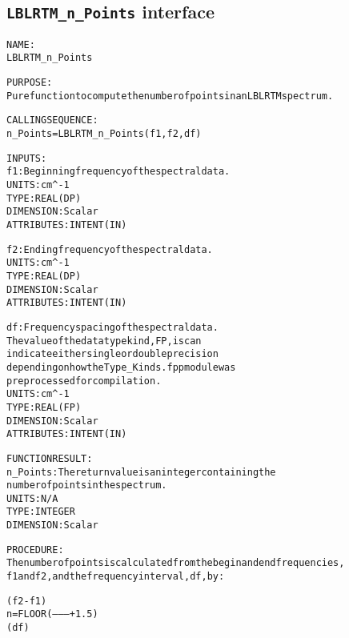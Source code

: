\subsection{\texttt{LBLRTM\_n\_Points} interface}
  \label{sec:LBLRTM_n_Points_interface}
  \begin{alltt}
 
  NAME:
        LBLRTM_n_Points
 
  PURPOSE:
        Pure function to compute the number of points in an LBLRTM spectrum.
 
  CALLING SEQUENCE:
        n_Points = LBLRTM_n_Points( f1, f2, df )
 
  INPUTS:
        f1:        Beginning frequency of the spectral data.
                   UNITS:      cm^-1
                   TYPE:       REAL(DP)
                   DIMENSION:  Scalar
                   ATTRIBUTES: INTENT(IN)
 
        f2:        Ending frequency of the spectral data.
                   UNITS:      cm^-1
                   TYPE:       REAL(DP)
                   DIMENSION:  Scalar
                   ATTRIBUTES: INTENT(IN)
 
        df:        Frequency spacing of the spectral data.
                   The value of the data type kind, FP, is can
                   indicate either single or double precision
                   depending on how the Type_Kinds.fpp module was
                   preprocessed for compilation.
                   UNITS:      cm^-1
                   TYPE:       REAL(FP)
                   DIMENSION:  Scalar
                   ATTRIBUTES: INTENT(IN)
 
  FUNCTION RESULT:
        n_Points:  The return value is an integer containing the
                   number of points in the spectrum.
                   UNITS:      N/A
                   TYPE:       INTEGER
                   DIMENSION:  Scalar
 
  PROCEDURE:
        The number of points is calculated from the begin and end frequencies,
        f1 and f2, and the frequency interval, df, by:
 
                    ( f2 - f1        )
          n = FLOOR (--------- + 1.5 )
                    (   df           )
 
  \end{alltt}
